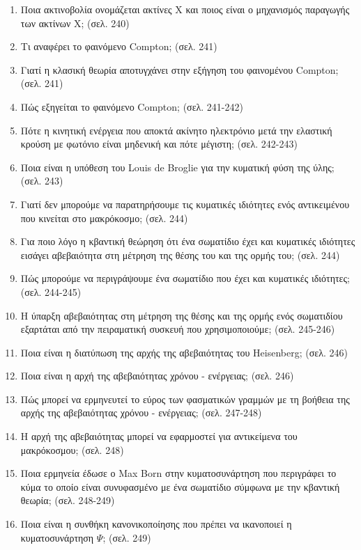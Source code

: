 \documentclass{article}
\begin{document}
\begin{enumerate}
      \item Ποια ακτινοβολία ονομάζεται ακτίνες Χ και ποιος είναι ο μηχανισμός παραγωγής των ακτίνων Χ; (σελ. 240)

      \item Τι αναφέρει το φαινόμενο Compton; (σελ. 241)

      \item Γιατί η κλασική θεωρία αποτυγχάνει στην εξήγηση του φαινομένου Compton; (σελ. 241)

      \item Πώς εξηγείται το φαινόμενο Compton; (σελ. 241-242)

      \item Πότε η κινητική ενέργεια που αποκτά ακίνητο ηλεκτρόνιο μετά την ελαστική κρούση με φωτόνιο είναι μηδενική και πότε μέγιστη; (σελ. 242-243)

      \item Ποια είναι η υπόθεση του Louis de Broglie για την κυματική φύση της ύλης; (σελ. 243)

      \item Γιατί δεν μπορούμε να παρατηρήσουμε τις κυματικές ιδιότητες ενός αντικειμένου που κινείται στο μακρόκοσμο; (σελ. 244)

      \item Για ποιο λόγο η κβαντική θεώρηση ότι ένα σωματίδιο έχει και κυματικές ιδιότητες εισάγει αβεβαιότητα στη μέτρηση της θέσης του και της ορμής του; (σελ. 244)

      \item Πώς μπορούμε να περιγράψουμε ένα σωματίδιο που έχει και κυματικές ιδιότητες; (σελ. 244-245)

      \item Η ύπαρξη αβεβαιότητας στη μέτρηση της θέσης και της ορμής ενός σωματιδίου εξαρτάται από την πειραματική συσκευή που χρησιμοποιούμε; (σελ. 245-246)

      \item Ποια είναι η διατύπωση της αρχής της αβεβαιότητας του Heisenberg; (σελ. 246)

      \item Ποια είναι η αρχή της αβεβαιότητας χρόνου - ενέργειας; (σελ. 246)

      \item Πώς μπορεί να ερμηνευτεί το εύρος των φασματικών γραμμών με τη βοήθεια της αρχής της αβεβαιότητας χρόνου - ενέργειας; (σελ. 247-248)

      \item Η αρχή της αβεβαιότητας μπορεί να εφαρμοστεί για αντικείμενα του μακρόκοσμου; (σελ. 248)

      \item Ποια ερμηνεία έδωσε ο Max Born στην κυματοσυνάρτηση που περιγράφει το κύμα το οποίο είναι συνυφασμένο με ένα σωματίδιο σύμφωνα με την κβαντική θεωρία; (σελ. 248-249)

      \item Ποια είναι η συνθήκη κανονικοποίησης που πρέπει να ικανοποιεί η κυματοσυνάρτηση $\Psi$; (σελ. 249)
\end{enumerate}
\end{document}
